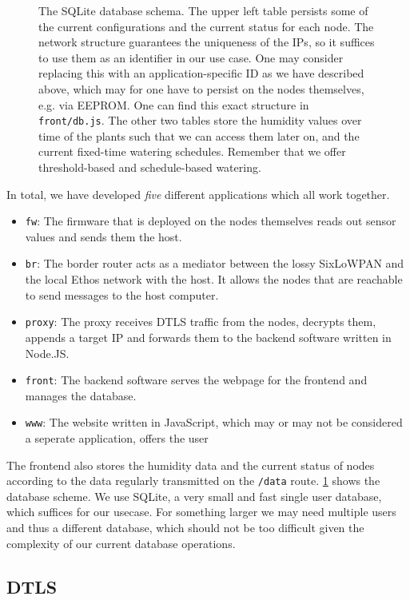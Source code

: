 \documentclass[acmtog, language=english, nonacm]{acmart}
\begin{document}
\begin{figure}[!hbtp]
        \caption{The SQLite database schema. The upper left table persists some of the current configurations and the current status for each node. The network structure guarantees the uniqueness of the IPs, so it suffices to use them as an identifier in our use case. One may consider replacing this with an application-specific ID as we have described above, which may for one have to persist on the nodes themselves, e.g. via EEPROM. One can find this exact structure in \texttt{front/db.js}. The other two tables store the humidity values over time of the plants such that we can access them later on, and the current fixed-time watering schedules. Remember that we offer threshold-based and schedule-based watering.}
        \label{fig:db_scheme}
    \end{figure}

    In total, we have developed \emph{five} different applications which all work together.
    \begin{itemize}
        \item \texttt{fw}: The firmware that is deployed on the nodes themselves reads out sensor values and sends them the host.
        \item \texttt{br}: The border router acts as a mediator between the lossy SixLoWPAN and the local Ethos network with the host. It allows the nodes that are reachable to send messages to the host computer.
        \item \texttt{proxy}: The proxy receives DTLS traffic from the nodes, decrypts them, appends a target IP and forwards them to the backend software written in Node.JS.
        \item \texttt{front}: The backend software serves the webpage for the frontend and manages the database.
        \item \texttt{www}: The website written in JavaScript, which may or may not be considered a seperate application, offers the user
    \end{itemize}

    The frontend also stores the humidity data and the current status of nodes according to the data regularly transmitted on the \texttt{/data} route. \cref{fig:db_scheme} shows the database scheme. We use SQLite, a very small and fast single user database, which suffices for our usecase. For something larger we may need multiple users and thus a different database, which should not be too difficult given the complexity of our current database operations.

    \label{subsec:dtls} \subsection{DTLS}
\end{document}
